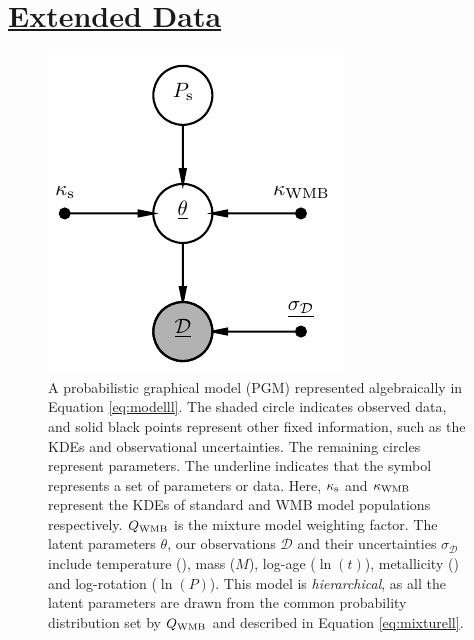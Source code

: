 \clearpage 
\section*{\underline{Extended Data}}

\setcounter{figure}{0}    

\begin{figure}[h!]
	\centering
	\includegraphics[width=0.6 \textwidth]{pgm_models.pdf}
	\caption{A probabilistic graphical model (PGM) represented algebraically in Equation \ref{eq:modelll}. The shaded circle indicates observed data, and solid black points represent other fixed information, such as the KDEs and observational uncertainties. The remaining circles represent parameters. The underline indicates that the symbol represents a set of parameters or data. Here, $\kappa_{\rm{s}}$ and $\kappa_{\rm WMB}$ represent the KDEs of standard and WMB model populations respectively. $Q_{\rm{WMB}}$ is the mixture model weighting factor. The latent parameters $\theta$, our observations $\mathcal{D}$ and their uncertainties $\sigma_{\mathcal{D}}$ include temperature (\teff), mass ($M$), log-age ($\ln(t)$), metallicity (\feh) and log-rotation ($\ln(P)$). This model is \textit{hierarchical}, as all the latent parameters are drawn from the common probability distribution set by $Q_{\rm{WMB}}$ and described in Equation \ref{eq:mixturell}.}
	\label{fig:pgm}
\end{figure}

